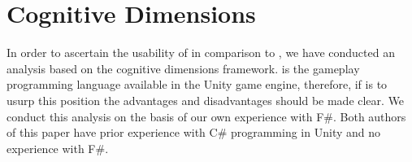 \section{Cognitive Dimensions}
In order to ascertain the usability of \fs in comparison to \cs, we have conducted an analysis based on the cognitive dimensions framework\cite{green1996usability}. \cs is the gameplay programming language available in the Unity game engine, therefore, if \fs is to usurp this position the advantages and disadvantages should be made clear. We conduct this analysis on the basis of our own experience with F\#. Both authors of this paper have prior experience with C\# programming in Unity and no experience with F\#.














